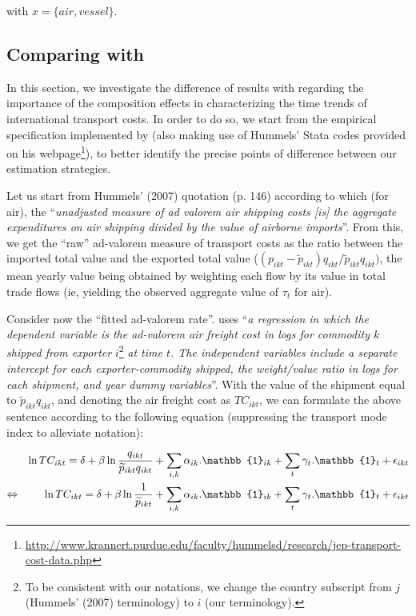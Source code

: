 \documentclass[a4paper,11pt]{article}
\begin{document}
\noindent with $x=\{air, vessel\}$.


\subsection{Comparing with \cite{hummels2007}}

In this section, we investigate the difference of results with \cite{hummels2007} regarding the importance of the composition effects in characterizing the time trends of international transport costs. In order to do so, we start from the empirical specification implemented by \cite{hummels2007} (also making use of Hummels' Stata codes provided on his webpage\footnote{\url{http://www.krannert.purdue.edu/faculty/hummelsd/research/jep-transport-cost-data.php}}), to better identify the precise points of difference between our estimation strategies.

Let us start from Hummels' (2007) quotation (p. 146) according to which (for air), the ``\textit{unadjusted measure of ad valorem air shipping costs [is] the aggregate expenditures on air shipping divided by the value of airborne imports}''. From this, we get the ``raw'' ad-valorem measure of transport costs as the ratio between the imported total value and the exported total value ($(p_{ikt} - \widetilde{p}_{ikt})q_{ikt}/\widetilde{p}_{ikt}q_{ikt})$, the mean yearly value being obtained by weighting each flow by its value in total trade flows (ie, yielding the observed aggregate value of $\tau_t$ for air).

Consider now the ``fitted ad-valorem rate''. \cite{hummels2007} uses ``\textit{a regression in which the dependent variable is the ad-valorem air freight cost in logs for commodity $k$ shipped from exporter} $i$\footnote{To be consistent with our notations, we change the country subscript from $j$ (Hummels' (2007) terminology) to $i$ (our terminology).} \textit{at time $t$. The independent variables include a separate intercept for each exporter-commodity shipped, the weight/value ratio in logs for each shipment, and year dummy variables}''. With the value of the shipment equal to $\widetilde{p}_{ikt}q_{ikt}$, and denoting the air freight cost as $TC_{ikt}$, we can formulate the above sentence according to the following equation (suppressing the transport mode index to alleviate notation):

\begin{eqnarray}
&&\ln TC_{ikt} = \delta+ \beta \ln \frac{q_{ikt}}{\widetilde{p}_{ikt}q_{ikt}} + \sum_{i,k}\alpha_{ik}.\mathbb{1}_{ik}+ \sum_{t}\gamma_{t}.\mathbb{1}_{t} + \epsilon_{ikt} \notag \\
\Leftrightarrow && \ln TC_{ikt} = \delta+ \beta \ln \frac{1}{\widetilde{p}_{ikt}} + \sum_{i,k}\alpha_{ik}.\mathbb{1}_{ik}+ \sum_{t}\gamma_{t}.\mathbb{1}_{t} + \epsilon_{ikt} \label{eq:Hummels1}
\end{eqnarray}
\end{document}
